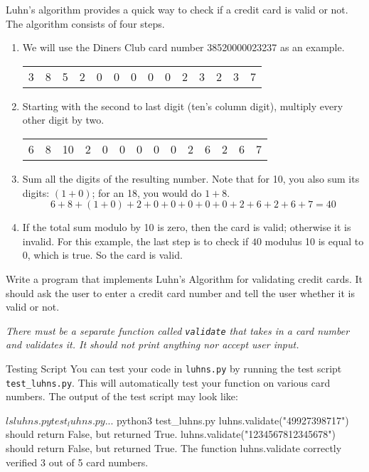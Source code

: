 \documentclass[11pt]{cselabheader}
\begin{document}
\begin{ex}[luhns.py]
Luhn's algorithm provides a quick way to
 check if a credit card is valid or not. The algorithm consists of four
 steps.

 \begin{enumerate}

\item We will use the Diners Club card number 38520000023237 as an example.

 \begin{center}
 \begin{tabular}{llllllllllllll}
3 & 8 & 5 & 2 & 0 & 0 & 0 & 0 & 0 & 2 & 3 & 2 & 3 & 7\\
 \end{tabular}
 \end{center}

\item Starting with the second to last digit (ten's column digit),
     multiply every other digit by two.
 \begin{center}
 \begin{tabular}{llllllllllllll}
6 & 8 & 10 & 2 & 0 & 0 & 0 & 0 & 0 & 2 & 6 & 2 & 6 & 7
 \end{tabular}
 \end{center}

\item Sum all the digits of the resulting number.
 Note that for 10, you also sum its digits: $(1 + 0)$; for an 18, you would do $1 + 8$.
 \[ 6 + 8 + (1 + 0) + 2 + 0 + 0 + 0 + 0 + 0 + 2 + 6 + 2 + 6 + 7 = 40 \]

 \item If the total sum modulo by 10 is zero, then the card is valid;
     otherwise it is invalid.
 For this example, the last step is to check if $40$ modulus 10 is equal to 0, which is true.
 So the card is valid.
 \end{enumerate}

 Write a program that implements Luhn's Algorithm for validating credit
 cards. It should ask the user to enter a credit card number and tell the
 user whether it is valid or not.

 \emph{There must be a separate function called \texttt{validate} that
  takes in a card number and validates it. It should not print anything
  nor accept user input.}

\end{ex}

\begin{infobox}{Testing Script}
You can test your code in \texttt{luhns.py} by running the test script
\texttt{test\_luhns.py}. This will automatically test your function on various
card numbers. The output of the test script may look like:

\begin{bashcode}
$ ls
luhns.py test_luhns.py ...
$ python3 test_luhns.py
luhns.validate("49927398717") should return False, but returned True.
luhns.validate("1234567812345678") should return False, but returned True.
The function luhns.validate correctly verified 3 out of 5 card numbers.
\end{bashcode}

\end{infobox}
\end{document}
